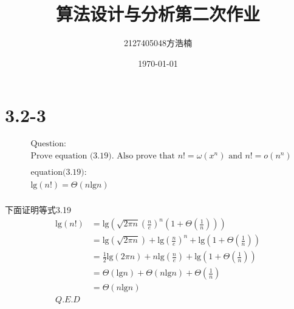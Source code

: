 \documentclass{ctexart}
\title{算法设计与分析第二次作业}
\author{2127405048方浩楠}
\date{\today}
\begin{document}
\maketitle

\section{3.2-3}

\begin{align*}
& \text{Question:} \\
& \text{Prove equation (3.19). Also prove that }n! = \omega (x^n) \text{ and } n! = o(n^n) \\
& \\
& \text{equation(3.19):}\\
& \text{lg}(n!) = \Theta(n\text{lg}n) \\
\end{align*}

下面证明等式3.19
\begin{align*}
     \text{lg}(n!) &= \text{lg}(\sqrt{2 \pi n}(\frac{n}{e})^n(1+\Theta(\frac{1}{n})) )\\
     & = \text{lg}(\sqrt{2 \pi n}) + \text{lg}(\frac{n}{e})^n+\text{lg}(1+\Theta(\frac{1}{n})) \\
     & = \frac{1}{2}\text{lg}(2 \pi n) + n\text{lg}(\frac{n}{e}) + \text{lg}(1+\Theta(\frac{1}{n})) \\
     & = \Theta(\text{lg}n) + \Theta(n\text{lg}n) + \Theta(\frac{1}{n})\\
     & = \Theta(n\text{lg}n) \\
     Q.E.D
\end{align*}
\end{document}
